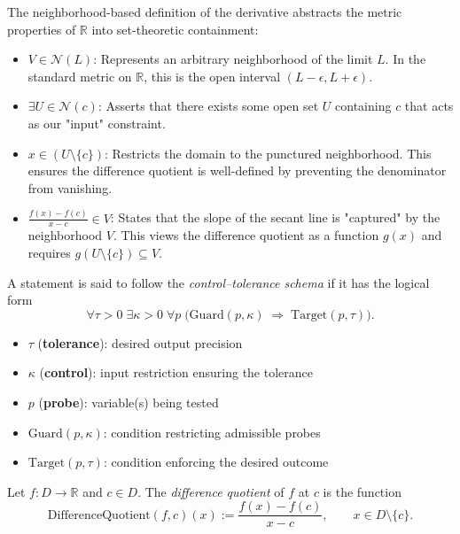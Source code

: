 \begin{remark}
The neighborhood-based definition of the derivative abstracts the metric properties of $\mathbb{R}$ into set-theoretic containment:
\begin{itemize}
    \item \textbf{$V \in \mathcal{N}(L)$}: Represents an arbitrary neighborhood of the limit $L$. In the standard metric on $\mathbb{R}$, this is the open interval $(L - \epsilon, L + \epsilon)$.
    \item \textbf{$\exists U \in \mathcal{N}(c)$}: Asserts that there exists some open set $U$ containing $c$ that acts as our "input" constraint.
    \item \textbf{$x \in (U \setminus \{c\})$}: Restricts the domain to the punctured neighborhood. This ensures the difference quotient is well-defined by preventing the denominator from vanishing.
    \item \textbf{$\frac{f(x) - f(c)}{x - c} \in V$}: States that the slope of the secant line is "captured" by the neighborhood $V$. This views the difference quotient as a function $g(x)$ and requires $g(U \setminus \{c\}) \subseteq V$.
\end{itemize}
\end{remark}


\begin{definition}
A statement is said to follow the \emph{control--tolerance schema} if it has the logical form
\[
\forall \tau > 0\;\exists \kappa > 0\;\forall p\;
\big( \mathrm{Guard}(p,\kappa) \;\Rightarrow\; \mathrm{Target}(p,\tau) \big).
\]
\begin{itemize}
    \item $\tau$ (\textbf{tolerance}): desired output precision
    \item $\kappa$ (\textbf{control}): input restriction ensuring the tolerance
    \item $p$ (\textbf{probe}): variable(s) being tested
    \item $\mathrm{Guard}(p,\kappa)$: condition restricting admissible probes
    \item $\mathrm{Target}(p,\tau)$: condition enforcing the desired outcome
\end{itemize}
\end{definition}

\begin{definition}
Let $f : D \to \mathbb{R}$ and $c \in D$. The \emph{difference quotient} of $f$ at $c$ is the function
\[
\mathrm{DifferenceQuotient}(f,c)(x)
:=
\frac{f(x) - f(c)}{x - c},
\qquad x \in D \setminus \{c\}.
\]
\end{definition}


